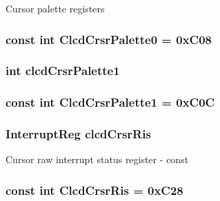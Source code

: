 \label{classPl111_a8b6f78d34ea5c7859df6b9b42301ceff}
Cursor palette registers \hypertarget{classPl111_a117f2a62438a22f2087b12f5c4863d7a}{
\subsubsection[{ClcdCrsrPalette0}]{\setlength{\rightskip}{0pt plus 5cm}const int {\bf ClcdCrsrPalette0} = 0xC08}}
\label{classPl111_a117f2a62438a22f2087b12f5c4863d7a}
\hypertarget{classPl111_a5705f1065367bfed27b41d67082286b8}{
\subsubsection[{clcdCrsrPalette1}]{\setlength{\rightskip}{0pt plus 5cm}int {\bf clcdCrsrPalette1}}}
\label{classPl111_a5705f1065367bfed27b41d67082286b8}
\hypertarget{classPl111_aa357b0e8940dad7feaa2084a10f20e9a}{
\subsubsection[{ClcdCrsrPalette1}]{\setlength{\rightskip}{0pt plus 5cm}const int {\bf ClcdCrsrPalette1} = 0xC0C}}
\label{classPl111_aa357b0e8940dad7feaa2084a10f20e9a}
\hypertarget{classPl111_a63a1037985c9e525a4adf69e4d593b85}{
\subsubsection[{clcdCrsrRis}]{\setlength{\rightskip}{0pt plus 5cm}InterruptReg {\bf clcdCrsrRis}}}
\label{classPl111_a63a1037985c9e525a4adf69e4d593b85}
Cursor raw interrupt status register -\/ const \hypertarget{classPl111_acc89af7644d93d9abef747b1980cb90d}{
\subsubsection[{ClcdCrsrRis}]{\setlength{\rightskip}{0pt plus 5cm}const int {\bf ClcdCrsrRis} = 0xC28}}
